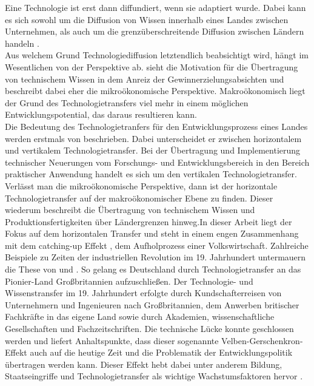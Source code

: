 Eine Technologie ist erst dann diffundiert, wenn sie adaptiert wurde. Dabei kann es sich sowohl um die Diffusion von Wissen innerhalb eines Landes zwischen Unternehmen, als auch um die grenz{\"u}berschreitende Diffusion zwischen L{\"a}ndern handeln \cite{Acemoglu.2009}.\\


Aus welchem Grund Technologiediffusion letztendlich beabsichtigt wird, h{\"a}ngt im Wesentlichen von der Perspektive ab. \citet{Arrow.1969} sieht die Motivation f{\"u}r die {\"U}bertragung von technischem Wissen in dem Anreiz der Gewinnerzielungsabsichten und beschreibt dabei eher die mikro{\"o}konomische Perspektive. Makro{\"o}konomisch liegt der Grund des Technologietransfers viel mehr in einem m{\"o}glichen Entwicklungspotential, das daraus resultieren kann.\\


Die Bedeutung des Technologietranfers f{\"u}r den Entwicklungsprozess eines Landes werden erstmals von \citet{Gerschenkron.1962} beschrieben. Dabei unterscheidet er zwischen horizontalem und vertikalem Technologietransfer. Bei der {\"U}bertragung und Implementierung technischer Neuerungen vom Forschungs- und Entwicklungsbereich in den Bereich praktischer Anwendung handelt es sich um den vertikalen Technologietransfer. Verl{\"a}sst man die mikro{\"o}konomische Perspektive, dann ist der horizontale Technologietransfer auf der makro{\"o}konomischer Ebene zu finden. Dieser wiederum beschreibt die {\"U}bertragung von technischem Wissen und Produktionsfertigkeiten {\"u}ber L{\"a}ndergrenzen hinweg.\newline In dieser Arbeit liegt der Fokus auf dem horizontalen Transfer und steht in einem engen Zusammenhang mit dem catching-up Effekt , dem Aufholprozess einer Volkswirtschaft. Zahlreiche Beispiele zu Zeiten der industriellen Revolution im 19. Jahrhundert untermauern die These von \citet{Gerschenkron.1962} und \citet{Veblen.1915}. So gelang es Deutschland durch Technologietransfer an das Pionier-Land Gro{\ss}britannien aufzuschlie{\ss}en. Der Technologie- und Wissenstransfer im 19. Jahrhundert erfolgte durch Kundschafterreisen von Unternehmern und Ingenieuren nach Gro{\ss}britannien, dem Anwerben britischer Fachkr{\"a}fte in das eigene Land sowie durch Akademien, wissenschaftliche Gesellschaften und Fachzeitschriften. Die technische L{\"u}cke konnte geschlossen werden und liefert Anhaltspunkte, dass dieser sogenannte Velben-Gerschenkron-Effekt auch auf die heutige Zeit und die Problematik der Entwicklungspolitik {\"u}bertragen werden kann. Dieser Effekt hebt dabei unter anderem Bildung, Staatseingriffe und Technologietransfer als wichtige Wachstumsfaktoren hervor \cite{Peri.2004}. \\


